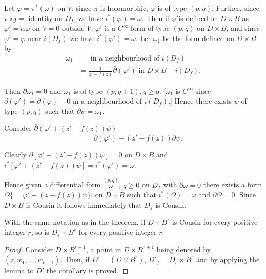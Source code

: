 Let $\varphi = \pi^*(\omega)$ on $V$; since $\pi$ is holomorphic,
$\varphi$ is of type $(p,q)$. Further, since $\pi \circ j =$ identity on
$D_f$, we have $i^* (\varphi) = \omega$. Then if $\varphi'$\pageoriginale is defined
on $D \times B$ as $\varphi' = \alpha \varphi$ on $V = 0$ outside $V$,
$\varphi'$ is a $C^\infty$ form of type $(p,q)$ on $D \times B$, and
since $\varphi' = \varphi$ near $i(D_f)$ we have $i^* (\varphi') =
\omega$. Let $\omega_1$ be the form defined on $D \times B$ by  
\begin{align*}
  \omega_1 & = \text{ in a neighbourhood of } i(D_f) \\
  & = \frac{ 1}{z' - f(z)} \bar{\partial}(\varphi') \text{ in } D
  \times B - i (D_f). 
\end{align*} 
 
Then $\bar{\partial} \omega_1 = 0$ and $\omega_1$ is of type $(p,
q+1), q \geq o$. [$\omega_1$ is $C^\infty$ since $\bar{\partial}
  (\varphi') = \bar{\partial} (\varphi) - 0$ in a neighbourhood of
  $i(D_f)$.] Hence there exists $\psi$ of type $(p,q)$ such that
$\bar{\partial} \psi = \omega_1$. 
 
Consider $\bar{\partial} (\varphi' + (z' - f(z)) \psi) $
$$
= \bar{\partial} (\varphi') - (z' - f(z)) \bar{\partial} \psi.
$$

Clearly $\bar{\partial} [ \varphi' + (z' - f (z)) \psi]
= 0$ on $D \times B$ and $i^* [\varphi' + (z' - f(z)) \psi] = i^*
(\varphi') = \omega$. 

Hence given a differential form $\overset{(p,q)} \omega$, $q \geq 0$ on
$D_f$ with $\bar{\partial} \omega = 0$ there exists a form $\Omega \{
= \varphi' + (z - f(z)) \psi \}$, on $D \times B$ such that
$i^*(\Omega) = \omega$ and $\bar{\partial} \Omega = 0$. Since $D
\times B$ is Cousin it follows immediately that $D_f$ is Cousin. 

\begin{coro*}
  With the same notation as in the theorem, if $D \times B^r$ is
  Cousin for every positive integer $r$, so is $D_f \times B^r$ for
  every positive integer $r$. 	 
\end{coro*} 

\begin{proof}
  Consider $D \times B^{r + 1}$, a point in $D \times B^{r + 1}$ being
  denoted by \break $(z, w_1, \ldots , w_{r+1})$. Then, if $D' = (D \times
  B^r)$, $D'_f = D_r \times B^r$ and by applying the lemma to $D'$ the
  corollary is proved. 
\end{proof} 

